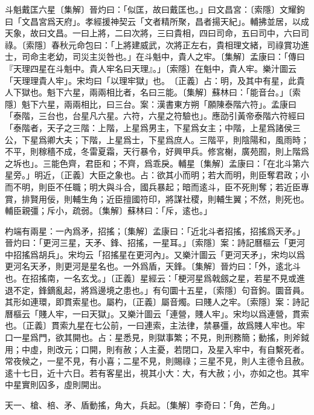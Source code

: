 斗魁戴匡六星〔集解〕晉灼曰：「似匡，故曰戴匡也。」曰文昌宮：〔索隱〕文耀鉤曰「文昌宮爲天府」。孝經援神契云「文者精所聚，昌者揚天紀」。輔拂並居，以成天象，故曰文昌。一曰上將，二曰次將，三曰貴相，四曰司命，五曰司中，六曰司祿。〔索隱〕春秋元命包曰：「上將建威武，次將正左右，貴相理文緒，司祿賞功進士，司命主老幼，司災主災咎也。」在斗魁中，貴人之牢。〔集解〕孟康曰：「傳曰『天理四星在斗魁中。貴人牢名曰天理』。」〔索隱〕在魁中，貴人牢。樂汁圖云「天理理貴人牢」。宋均曰「以理牢獄」也。　〔正義〕占：明，及其中有星，此貴人下獄也。魁下六星，兩兩相比者，名曰三能。〔集解〕蘇林曰：「能音台。」〔索隱〕魁下六星，兩兩相比，曰三台。案：漢書東方朔「願陳泰階六符」。孟康曰「泰階，三台也，台星凡六星。六符，六星之符驗也」。應劭引黃帝泰階六符經曰「泰階者，天子之三階：上階，上星爲男主，下星爲女主；中階，上星爲諸侯三公，下星爲卿大夫；下階，上星爲士，下星爲庶人。三階平，則陰陽和，風雨時；不平，則稼穡不成，冬雷夏霜，天行暴令，好興甲兵。修宮榭，廣苑囿，則上階爲之坼也」。三能色齊，君臣和；不齊，爲乖戾。輔星〔集解〕孟康曰：「在北斗第六星旁。」明近，〔正義〕大臣之象也。占：欲其小而明；若大而明，則臣奪君政；小而不明，則臣不任職；明大與斗合，國兵暴起；暗而逺斗，臣不死則奪；若近臣專賞，排賢用佞，則輔生角；近臣擅國符印，將謀社稷，則輔生翼；不然，則死也。輔臣親彊；斥小，疏弱。〔集解〕蘇林曰：「斥，逺也。」

杓端有兩星：一內爲矛，招搖；〔集解〕孟康曰：「近北斗者招搖，招搖爲天矛。」晉灼曰：「更河三星，天矛、鋒、招搖，一星耳。」〔索隱〕案：詩記曆樞云「更河中招搖爲胡兵」。宋均云「招搖星在更河內」。又樂汁圖云「更河天矛」，宋均以爲更河名天矛，則更河是星名也。一外爲盾，天鋒。〔集解〕晉灼曰：「外，逺北斗也。在招搖南，一名玄戈。」〔正義〕星經云：「梗河星爲戟劔之星，若星不見或進退不定，鋒鏑亂起，將爲邊境之患也。」有句圜十五星，〔索隱〕句音鉤。圜音員。其形如連環，即貫索星也。屬杓，〔正義〕屬音燭。曰賤人之牢。〔索隱〕案：詩記曆樞云「賤人牢，一曰天獄」。又樂汁圖云「連營，賤人牢」。宋均以爲連營，貫索也。〔正義〕貫索九星在七公前，一曰連索，主法律，禁暴彊，故爲賤人牢也。牢口一星爲門，欲其開也。占：星悉見，則獄事繁；不見，則刑務簡；動搖，則斧鉞用；中虛，則改元；口開，則有赦；人主憂，若閉口，及星入牢中，有自繫死者。常夜候之，一星不見，有小喜；二星不見，則賜祿；三星不見，則人主德令且赦。逺十七日，近十六日。若有客星出，視其小大：大，有大赦；小，亦如之也。其牢中星實則囚多，虛則開出。

天一、槍、棓、矛、盾動搖，角大，兵起。〔集解〕李奇曰：「角，芒角。」

